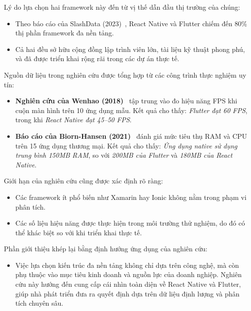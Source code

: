 \begin{flushleft}
    \hspace*{0.8cm}Lý do lựa chọn hai framework này đến từ vị thế dẫn đầu thị trường của chúng:
    \setlength{\leftmargini}{1.0cm}
    \begin{itemize}
        \item Theo báo cáo của SlashData (2023)~\cite{slashdata2023}, React Native và Flutter chiếm đến 80\% thị phần framework đa nền tảng.
        \item Cả hai đều sở hữu cộng đồng lập trình viên lớn, tài liệu kỹ thuật phong phú, và đã được triển khai rộng rãi trong các dự án thực tế.
    \end{itemize}
\end{flushleft}

\begin{flushleft}
    \hspace*{0.8cm}Nguồn dữ liệu trong nghiên cứu được tổng hợp từ các công trình thực nghiệm uy tín:
    \setlength{\leftmargini}{1.0cm}
    \begin{itemize}
        \item \textbf{Nghiên cứu của Wenhao (2018)}~\cite{wenhao2018} tập trung vào đo hiệu năng FPS khi cuộn màn hình trên 10 ứng dụng mẫu. Kết quả cho thấy: \textit{Flutter đạt 60 FPS}, trong khi \textit{React Native đạt 45–50 FPS}.
        \item \textbf{Báo cáo của Biorn-Hansen (2021)}~\cite{biornhansen2021} đánh giá mức tiêu thụ RAM và CPU trên 15 ứng dụng thương mại. Kết quả cho thấy: \textit{Ứng dụng native sử dụng trung bình 150MB RAM}, so với \textit{200MB của Flutter} và \textit{180MB của React Native}.
    \end{itemize}
\end{flushleft}

\begin{flushleft}
    \hspace*{0.8cm}Giới hạn của nghiên cứu cũng được xác định rõ ràng:
    \setlength{\leftmargini}{1.0cm}
    \begin{itemize}
        \item Các framework ít phổ biến như Xamarin hay Ionic không nằm trong phạm vi phân tích.
        \item Các số liệu hiệu năng được thực hiện trong môi trường thử nghiệm, do đó có thể khác biệt so với khi triển khai thực tế.
    \end{itemize}
\end{flushleft}

\begin{flushleft}
    \hspace*{0.8cm}Phần giới thiệu khép lại bằng định hướng ứng dụng của nghiên cứu:
    \setlength{\leftmargini}{1.0cm}
    \begin{itemize}
        \item Việc lựa chọn kiến trúc đa nền tảng không chỉ dựa trên công nghệ, mà còn phụ thuộc vào mục tiêu kinh doanh và nguồn lực của doanh nghiệp. Nghiên cứu này hướng đến cung cấp cái nhìn toàn diện về React Native và Flutter, giúp nhà phát triển đưa ra quyết định dựa trên dữ liệu định lượng và phân tích chuyên sâu.
    \end{itemize}
\end{flushleft}
